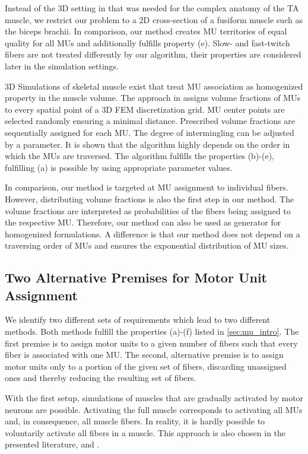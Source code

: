 Instead of the 3D setting in \cite{Roehrle2012} that was needed for the complex anatomy of the TA muscle, we restrict our problem to a 2D cross-section of a fusiform muscle such as the biceps brachii. In comparison, our method creates MU territories of equal quality for all MUs and additionally fulfills property (e). Slow- and fast-twitch fibers are not treated differently by our algorithm, their properties are considered later in the simulation settings.

3D Simulations of skeletal muscle exist that treat MU association as homogenized property in the muscle volume. The approach in \cite{harry2018} assigns volume fractions of MUs to every spatial point of a 3D FEM discretization grid. MU center points are selected randomly ensuring a minimal distance. Prescribed volume fractions are sequentially assigned for each MU. The degree of intermingling can be adjusted by a parameter. It is shown that the algorithm highly depends on the order in which the MUs are traversed. The algorithm fulfills the properties (b)-(e), fulfilling (a) is possible by using appropriate parameter values.

In comparison, our method is targeted at MU assignment to individual fibers. However, distributing volume fractions is also the first step in our method. The volume fractions are interpreted as probabilities of the fibers being assigned to the respective MU. Therefore, our method can also be used as generator for homogenized formulations. A difference is that our method does not depend on a traversing order of MUs and ensures the exponential distribution of MU sizes.

\subsection{Two Alternative Premises for Motor Unit Assignment}

We identify two different sets of requirements which lead to two different methods.
Both methods fulfill the properties (a)-(f) listed in \cref{sec:mu_intro}.
The first premise is to assign motor units to a given number of fibers such that every fiber is associated with one MU. The second, alternative premise is to assign motor units only to a portion of the given set of fibers, discarding unassigned ones and thereby reducing the resulting set of fibers.

With the first setup, simulations of muscles that are gradually activated by motor neurons are possible. Activating the full muscle corresponds to activating all MUs and, in consequence, all muscle fibers. In reality, it is hardly possible to voluntarily activate all fibers in a muscle. This approach is also chosen in the presented literature, \cite{Roehrle2012} and \cite{harry2018}.

